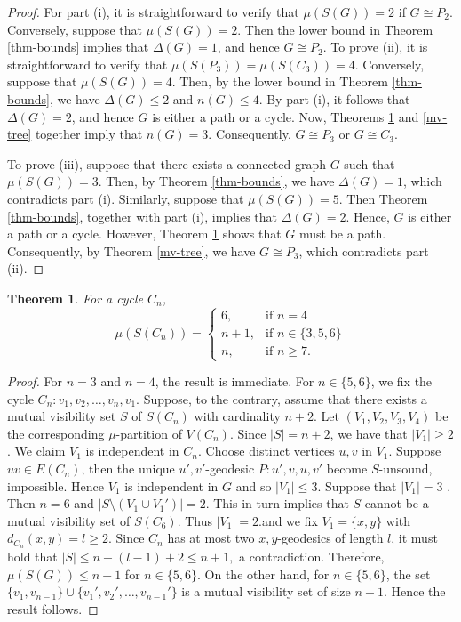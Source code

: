 \documentclass[a4paper,12pt]{article}
\newtheorem{theorem}{Theorem}[section]
\begin{document}
{\begin{proof}
For part (i), it is straightforward to verify that $\mu(S(G)) = 2$ if $G \cong P_2$. Conversely, suppose that $\mu(S(G)) = 2$. Then the lower bound in Theorem \ref{thm-bounds} implies that $\Delta(G) = 1$, and hence $G \cong P_2$.
 To prove (ii), it is straightforward to verify that 
$\mu(S(P_3)) = \mu(S(C_3)) = 4$. 
Conversely, suppose that $\mu(S(G)) = 4$. 
Then, by the lower bound in Theorem \ref{thm-bounds}, we have 
$\Delta(G) \leq 2$ and $n(G) \leq 4$. 
By part (i), it follows that $\Delta(G) = 2$, and hence $G$ is either a path or a cycle. 
Now, Theorems \ref{mv-cycle} and \ref{mv-tree} together imply that $n(G) = 3$. 
Consequently, $G \cong P_3$ or $G \cong C_3$.

To prove (iii), suppose that there exists a connected graph $G$ such that $\mu(S(G)) = 3$. 
Then, by Theorem \ref{thm-bounds}, we have $\Delta(G) = 1$, which contradicts part (i). 
Similarly, suppose that $\mu(S(G)) = 5$. 
Then Theorem \ref{thm-bounds}, together with part (i), implies that $\Delta(G) = 2$. 
Hence, $G$ is either a path or a cycle. 
However, Theorem \ref{mv-cycle} shows that $G$ must be a path. 
Consequently, by Theorem \ref{mv-tree}, we have $G \cong P_3$, which contradicts part (ii).

\end{proof}


\begin{theorem}\label{mv-cycle}
 For a cycle $C_n$, 
 $$ \mu(S(C_n))= \begin{cases}
        6, & \text{if } n=4\\
        n+1, & \text{if } n \in \{3,5,6\}\\
        n, & \text{if } n\geq 7.
    \end{cases}$$
\end{theorem}
\begin{proof}
    
For $n=3$ and $n=4$, the result is immediate. For $n\in \{5,6\}$, we fix the cycle $C_n:v_1,v_2,\dots,v_n,v_1$. Suppose, to the contrary, assume that there exists a mutual visibility set $S$ of $S(C_n)$ with cardinality $n+2$. Let $(V_1,V_2,V_3,V_4)$ be the corresponding $\mu$-partition of $V(C_n)$. Since $|S|=n+2$, we have that $\left|V_1 \right|\geq 2$. We claim $V_1$ is independent in $C_n$. Choose distinct vertices $u, v$ in $V_1$. Suppose $uv \in E(C_n)$, then the unique $u',v'$-geodesic  $P:u', v, u, v'$ become $S$-unsound,  impossible. Hence $V_1$ is independent in $G$ and so $|V_1|\leq 3$. Suppose that  $|V_1|= 3$ . Then $n=6$ and  $|S \setminus (V_1 \cup V_1')|= 2 $.  This in turn implies that $S$ cannot be a mutual visibility set of $S(C_6)$. Thus $\left|V_1\right|=2$.and we fix $V_1=\{x,y\}$ with $d_{C_n}(x,y)=l\geq 2$. Since $C_n$ has at  most two $x,y$-geodesics of length $l$, it must hold that $|S|\leq n-(l-1)+2\leq n+1,$ a contradiction. Therefore, $\mu(S(G))\leq n+1$ for $n\in \{5,6\}$. On the other hand, for $n\in\{5,6\}$, the set $\{v_1,v_{n-1}\}\cup\{v_1',v_2',\dots,v_{n-1}'\}$ is a mutual visibility set of size $n+1$. Hence the result follows.


\end{proof}}
\end{document}
